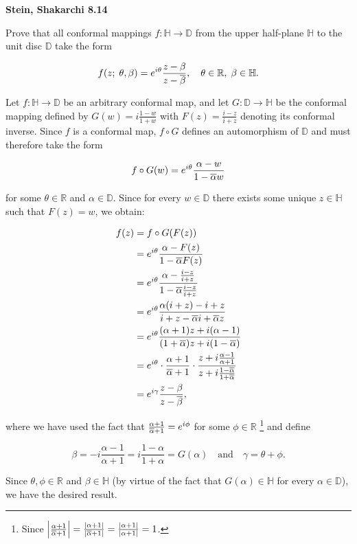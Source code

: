 \textbf{Stein, Shakarchi 8.14}

Prove that all conformal mappings $f: \mathbb{H} \to \mathbb{D}$ from the upper half-plane $\mathbb{H}$ to the unit disc 
$\mathbb{D}$ take the form

$$
f(z; \; \theta, \beta) = e^{i \theta} \frac{z - \beta}{z - \overline{\beta}}, \quad \theta \in \mathbb{R}, \; \beta \in \mathbb{H}.
$$

\begin{solution}
  Let $f: \mathbb{H} \to \mathbb{D}$ be an arbitrary conformal map, and let $G: \mathbb{D} \to \mathbb{H}$ be the 
  conformal mapping defined by $G(w) = i \frac{1 - w}{1 + w}$ with $F(z) = \frac{i - z}{i + z}$ denoting its conformal 
  inverse. Since $f$ is a conformal map, $f \circ G$ defines an automorphism of $\mathbb{D}$ and must therefore take the 
  form

  $$
  f \circ G(w) = e^{i \theta} \frac{\alpha - w}{1 - \overline{\alpha} w}
  $$

  for some $\theta \in \mathbb{R}$ and $\alpha \in \mathbb{D}$. Since for every $w \in \mathbb{D}$ there exists some 
  unique $z \in \mathbb{H}$ such that $F(z) = w$, we obtain:

  \begin{align*}
    f(z) &= f \circ G (F(z)) \\
    &= e^{i \theta} \frac{\alpha - F(z)}{1 - \overline{\alpha} F(z)} \\
    &= e^{i \theta} \frac{\alpha - \frac{i - z}{i + z}}{1 - \overline{\alpha} \frac{i - z}{i + z}} \\
    &= e^{i \theta} \frac{\alpha (i + z) - i + z}{i + z - \overline{\alpha} i + \overline{\alpha} z} \\
    &= e^{i \theta} \frac{(\alpha + 1) z + i (\alpha - 1)}{(1 + \overline{\alpha}) z + i(1 - \overline{\alpha})} \\
    &= e^{i \theta} 
       \cdot \frac{\alpha + 1}{\overline{\alpha} + 1} 
       \cdot \frac{z + i \frac{\alpha - 1}{\alpha + 1}}{z + i \frac{1 - \overline{\alpha}}{1 + \overline{\alpha}}} \\
    &= e^{i \gamma} \frac{z - \beta}{z - \overline{\beta}},
  \end{align*}

  where we have used the fact that $\frac{\alpha + 1}{\overline{\alpha} + 1} = e^{i \phi}$ for some $\phi \in \mathbb{R}$
  \footnote{
    Since $\left| \frac{\alpha + 1}{\overline{\alpha} + 1} \right| = \frac{|\alpha + 1|}{|\overline{\alpha} + 1|} = \frac{|\alpha + 1|}{|\alpha + 1|} = 1$.
  } and define

  $$
  \beta = -i \frac{\alpha - 1}{\alpha + 1} = i \frac{1 - \alpha}{1 + \alpha} = G(\alpha) \quad \text{and} \quad \gamma = \theta + \phi.
  $$

  Since $\theta, \phi \in \mathbb{R}$ and $\beta \in \mathbb{H}$ (by virtue of the fact that $G(\alpha) \in \mathbb{H}$ 
  for every $\alpha \in \mathbb{D}$), we have the desired result.
  \ \\
\end{solution}
